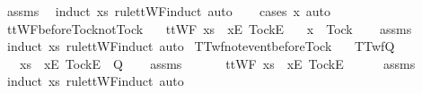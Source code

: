 \begin{isabellebody}
\ assms\ \isamarkupfalse%
\ {\isacharparenleft}induct\ xs\ rule{\isacharcolon}ttWF{\isachardot}induct{\isacharcomma}\ auto{\isacharparenright}\isanewline
\ \ \isamarkupfalse%
\ {\isacharparenleft}cases\ x{\isacharcomma}\ auto{\isacharparenright}%
\endisatagproof
{\isafoldproof}%
%
\isadelimproof
\isanewline
%
\endisadelimproof
\isanewline
{}\isamarkupfalse%
\ ttWF{\isacharunderscore}before{\isacharunderscore}Tock{\isacharunderscore}not{\isacharunderscore}Tock{\isacharcolon}\isanewline
\ \ \ {\isachardoublequoteopen}ttWF\ {\isacharparenleft}xs\ {\isacharat}\ {\isacharbrackleft}{\isacharbrackleft}x{}{\isacharbrackright}\isactrlsub E{\isacharcomma}\ {\isacharbrackleft}Tock{\isacharbrackright}\isactrlsub E{\isacharbrackright}{\isacharparenright}{\isachardoublequoteclose}\isanewline
\ \ \ {\isachardoublequoteopen}x{}\ {\isasymnoteq}\ Tock{\isachardoublequoteclose}\isanewline
%
\isadelimproof
\ \ %
\endisadelimproof
%
\isatagproof
{}\isamarkupfalse%
\ assms\ \isamarkupfalse%
\ {\isacharparenleft}induct\ xs\ rule{\isacharcolon}ttWF{\isachardot}induct{\isacharcomma}\ auto{\isacharparenright}%
\endisatagproof
{\isafoldproof}%
%
\isadelimproof
\isanewline
%
\endisadelimproof
\isanewline
{}\isamarkupfalse%
\ TTwf{\isacharunderscore}not{\isacharunderscore}event{\isacharunderscore}before{\isacharunderscore}Tock{\isacharcolon}\isanewline
\ \ \ {\isachardoublequoteopen}TTwf{\isacharparenleft}Q{\isacharparenright}{\isachardoublequoteclose}\isanewline
\ \ \ {\isachardoublequoteopen}xs\ {\isacharat}\ {\isacharbrackleft}{\isacharbrackleft}x{}{\isacharbrackright}\isactrlsub E{\isacharcomma}\ {\isacharbrackleft}Tock{\isacharbrackright}\isactrlsub E{\isacharbrackright}\ {\isasymnotin}\ Q{\isachardoublequoteclose}\isanewline
%
\isadelimproof
\ \ %
\endisadelimproof
%
\isatagproof
{}\isamarkupfalse%
\ assms\isanewline
{}\isamarkupfalse%
\ {\isacharminus}\isanewline
\ \ \isamarkupfalse%
\ {\isachardoublequoteopen}{\isasymnot}\ ttWF\ {\isacharparenleft}xs\ {\isacharat}\ {\isacharbrackleft}{\isacharbrackleft}x{}{\isacharbrackright}\isactrlsub E{\isacharcomma}\ {\isacharbrackleft}Tock{\isacharbrackright}\isactrlsub E{\isacharbrackright}{\isacharparenright}{\isachardoublequoteclose}\isanewline
\ \ \ \ \isamarkupfalse%
\ assms\ \isamarkupfalse%
\ {\isacharparenleft}induct\ xs\ rule{\isacharcolon}ttWF{\isachardot}induct{\isacharcomma}\ auto{\isacharparenright}\isanewline

\end{isabellebody}
